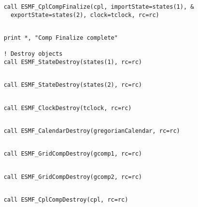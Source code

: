  \begin{verbatim}
    call ESMF_CplCompFinalize(cpl, importState=states(1), &
      exportState=states(2), clock=tclock, rc=rc)
 
\end{verbatim}
 

 \begin{verbatim}
    print *, "Comp Finalize complete"

    ! Destroy objects
    call ESMF_StateDestroy(states(1), rc=rc)
 
\end{verbatim}
 

 \begin{verbatim}
    call ESMF_StateDestroy(states(2), rc=rc)
 
\end{verbatim}
 

 \begin{verbatim}
    call ESMF_ClockDestroy(tclock, rc=rc)
 
\end{verbatim}
 

 \begin{verbatim}
    call ESMF_CalendarDestroy(gregorianCalendar, rc=rc)
 
\end{verbatim}
 

 \begin{verbatim}
    call ESMF_GridCompDestroy(gcomp1, rc=rc)
 
\end{verbatim}
 

 \begin{verbatim}
    call ESMF_GridCompDestroy(gcomp2, rc=rc)
 
\end{verbatim}
 

 \begin{verbatim}
    call ESMF_CplCompDestroy(cpl, rc=rc)
 
\end{verbatim}
 
